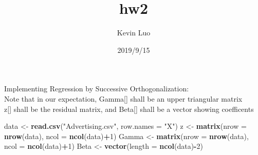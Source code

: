 \documentclass[]{article}
\title{hw2}
\author{Kevin Luo}
\date{2019/9/15}
\newenvironment{Shaded}{\begin{snugshade}}{\end{snugshade}}
\newcommand{\KeywordTok}[1]{\textcolor[rgb]{0.13,0.29,0.53}{\textbf{#1}}}
\newcommand{\DataTypeTok}[1]{\textcolor[rgb]{0.13,0.29,0.53}{#1}}
\newcommand{\DecValTok}[1]{\textcolor[rgb]{0.00,0.00,0.81}{#1}}
\newcommand{\StringTok}[1]{\textcolor[rgb]{0.31,0.60,0.02}{#1}}
\newcommand{\CommentTok}[1]{\textcolor[rgb]{0.56,0.35,0.01}{\textit{#1}}}
\newcommand{\OperatorTok}[1]{\textcolor[rgb]{0.81,0.36,0.00}{\textbf{#1}}}
\newcommand{\NormalTok}[1]{#1}
\begin{document}
\maketitle

Implementing Regression by Successive Orthogonalization:\\
Note that in our expectation, Gamma{[}{]} shall be an upper triangular
matrix\\
z{[}{]} shall be the residual matrix, and Beta{[}{]} shall be a vector
showing coefficents

\begin{Shaded}
\begin{Highlighting}[]
\NormalTok{data <-}\StringTok{ }\KeywordTok{read.csv}\NormalTok{(}\StringTok{"Advertising.csv"}\NormalTok{, }\DataTypeTok{row.names =} \StringTok{"X"}\NormalTok{)}
\NormalTok{z <-}\StringTok{ }\KeywordTok{matrix}\NormalTok{(}\DataTypeTok{nrow =} \KeywordTok{nrow}\NormalTok{(data), }\DataTypeTok{ncol =} \KeywordTok{ncol}\NormalTok{(data)}\OperatorTok{+}\DecValTok{1}\NormalTok{)}
\NormalTok{Gamma <-}\StringTok{ }\KeywordTok{matrix}\NormalTok{(}\DataTypeTok{nrow =} \KeywordTok{nrow}\NormalTok{(data), }\DataTypeTok{ncol =} \KeywordTok{ncol}\NormalTok{(data)}\OperatorTok{+}\DecValTok{1}\NormalTok{)}
\NormalTok{Beta <-}\StringTok{ }\KeywordTok{vector}\NormalTok{(}\DataTypeTok{length =} \KeywordTok{ncol}\NormalTok{(data)}\OperatorTok{-}\DecValTok{2}\NormalTok{)}
\end{Highlighting}
\end{Shaded}

\begin{Shaded}
\end{Shaded}
\end{document}
